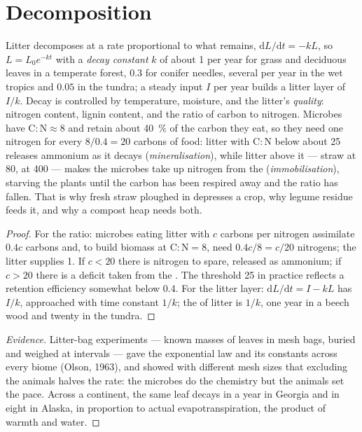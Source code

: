 \section{Decomposition}

\begin{theorem}\label{thm:b2:living-soil:decay}
Litter decomposes at a rate proportional to what remains,
$\mathrm{d}L/\mathrm{d}t = -kL$, so $L = L_0 e^{-kt}$ with a
\emph{decay constant} $k$ of about 1 per year for grass and
deciduous leaves in a temperate forest, $0.3$ for conifer needles,
several per year in the wet tropics and $0.05$ in the tundra;
a steady input $I$ per year builds a litter layer of $I/k$. Decay
is controlled by temperature, moisture, and the litter's
\emph{quality}: nitrogen content, lignin content, and the ratio of
carbon to nitrogen. Microbes have $\mathrm{C:N} \approx 8$ and
retain about \qty{40}{\%} of the carbon they eat, so they need one
nitrogen for every $8/0.4 = 20$ carbons of food: litter with $\mathrm{C:N}$
below about 25 releases ammonium as it decays
(\emph{mineralisation}), while litter above it --- straw at 80,
 at 400 --- makes the microbes take up nitrogen from the 
(\emph{immobilisation}), starving the plants until the carbon has
been respired away and the ratio has fallen. That is why fresh
straw ploughed in depresses a crop, why legume residue feeds it,
and why a compost heap needs both.
\end{theorem}
\begin{proof}
For the ratio: microbes eating litter with $c$ carbons per
nitrogen assimilate $0.4c$ carbons and, to build biomass at
$\mathrm{C:N} = 8$, need $0.4c/8 = c/20$ nitrogens; the litter
supplies 1. If $c < 20$ there is nitrogen to spare, released as
ammonium; if $c > 20$ there is a deficit taken from the . The
threshold 25 in practice reflects a retention efficiency somewhat
below 0.4. For the litter layer: $\mathrm{d}L/\mathrm{d}t = I - kL$
has  $I/k$, approached with time constant $1/k$; the
 of litter is $1/k$, one year in a beech wood and
twenty in the tundra.
\end{proof}
\begin{proof}[Evidence]
Litter-bag experiments --- known masses of leaves in mesh bags,
buried and weighed at intervals --- gave the exponential law and
its constants across every biome (Olson, 1963), and showed with
different mesh sizes that excluding the  animals halves the
rate: the microbes do the chemistry but the animals set the pace.
Across a continent, the same leaf decays in a year in Georgia and
in eight in Alaska, in proportion to actual evapotranspiration,
the product of warmth and water.
\end{proof}

